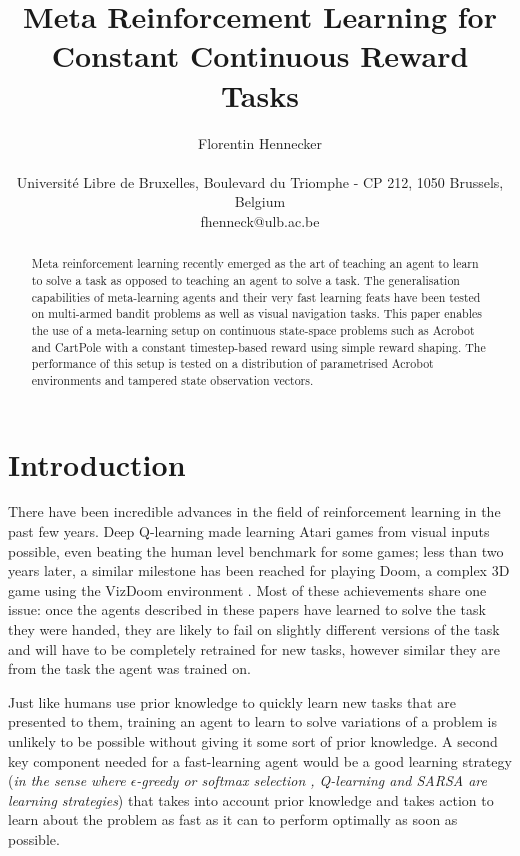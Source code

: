 \documentclass[letterpaper]{article}
\title{Meta Reinforcement Learning for Constant Continuous Reward Tasks}
\author{Florentin Hennecker \\
\mbox{}\\
Universit\'e Libre de Bruxelles, Boulevard du Triomphe - CP 212, 1050
Brussels, Belgium \\
fhenneck@ulb.ac.be}
\begin{document}
\maketitle

\begin{abstract}
	Meta reinforcement learning recently emerged as the art of teaching
	an agent to learn to solve a task as opposed to teaching an agent
	to solve a task. The generalisation capabilities of meta-learning
	agents and their very fast learning feats have been tested on 
	multi-armed bandit problems as well as visual navigation tasks. This
	paper enables the use of a meta-learning setup on continuous state-space
	problems such as Acrobot and CartPole with a constant timestep-based 
	reward using simple reward shaping. The performance of this setup
	is tested on a distribution of parametrised Acrobot environments and
	tampered state observation vectors.
\end{abstract}

\section{Introduction}
There have been incredible advances in the field of reinforcement learning
in the past few years. Deep Q-learning \citep{dqn, dqn_nature} made learning Atari
games from visual inputs possible, even beating the human level benchmark
for some games; less than two years later, a similar milestone has been reached
for playing Doom, a complex 3D game \citep{doom} using the VizDoom environment
\citep{vizdoom}. Most of these achievements share one issue: once the agents
described in these papers have learned to solve the task they were handed,
they are likely to fail on slightly different versions of the task and will
have to be completely retrained for new tasks, however similar they are from
the task the agent was trained on.

Just like humans use prior knowledge to quickly learn new tasks that are
presented to them, training an agent to learn to solve variations of a problem
is unlikely to be possible without giving it some sort of prior knowledge.
A second key component needed for a fast-learning agent would be a good
learning strategy (\textit{in the sense where $\epsilon$-greedy or softmax selection
\citep{suttonbarto}, Q-learning \citep{qlearning} and SARSA \citep{sarsa} 
are learning strategies})
that takes into account prior knowledge and takes action
to learn about the problem as fast as it can to perform optimally as
soon as possible.
\end{document}

